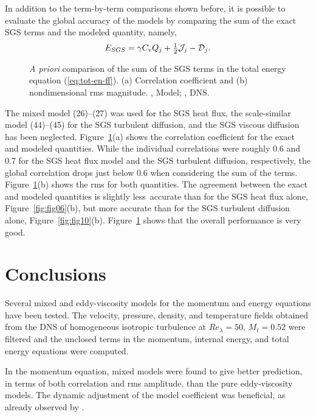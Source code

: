 \documentclass[tcfd]{svjour}
\begin{document}
In addition to the term-by-term comparisons shown before, it is
possible to evaluate the global accuracy of the models by comparing
the sum of the exact SGS terms and the modeled quantity, namely,
\begin{equation}
 \label{eq:global}
 E_{SGS}=\gamma C_{\rm v}Q_j + {\textstyle\half}{\cal J}_j - {\cal D}_j.
\end{equation}

\begin{figure}[t]
\vspace{85mm}%
\caption{{\it A priori} comparison of the sum of the SGS terms in
the total energy equation (\ref{eq:tot-en-ff}). (a) Correlation coeff\/icient and (b)
nondimensional rms magnitude. \solid, Model; \trian, DNS.}
\label{fig:fig12}
\end{figure}

The mixed model (26)--(27) was used for the SGS heat f\/lux, the
scale-similar model (44)--(45) for the SGS turbulent diffusion, and the SGS
viscous diffusion has been neglected. Figure~\ref{fig:fig12}(a) shows the correlation
coeff\/icient for the exact and modeled quantities. While the
individual correlations were roughly 0.6 and 0.7 for the SGS heat f\/lux
model and the SGS turbulent diffusion, respectively, the global
correlation drops just below 0.6 when considering the sum of the
terms. Figure~\ref{fig:fig12}(b) shows the rms for both quantities.
The agreement between the exact and modeled quantities is slightly
less\pagebreak\ accurate than for the SGS heat f\/lux alone, Figure~\ref{fig:fig06}(b), but more
accurate than for the SGS turbulent diffusion alone, Figure~\ref{fig:fig10}(b).
Figure~\ref{fig:fig12} shows that the overall performance is very good.


\section{Conclusions}
\label{sec:6}

Several mixed and eddy-viscosity models for the momentum and energy
equations have been tested. The velocity, pressure, density, and
temperature f\/ields obtained from the DNS of homogeneous isotropic
turbulence at $Re_\lambda=50$, $M_t=0.52$ were f\/iltered and the
unclosed terms in the momentum, internal energy, and total energy
equations were computed.

In the momentum equation, mixed models were found to give better
prediction, in terms of both correlation and {\rm rms} amplitude,
than the pure eddy-viscosity models. The dynamic adjustment of the
model coeff\/icient was benef\/icial, as already observed by
\citet{moi91}.
\end{document}
